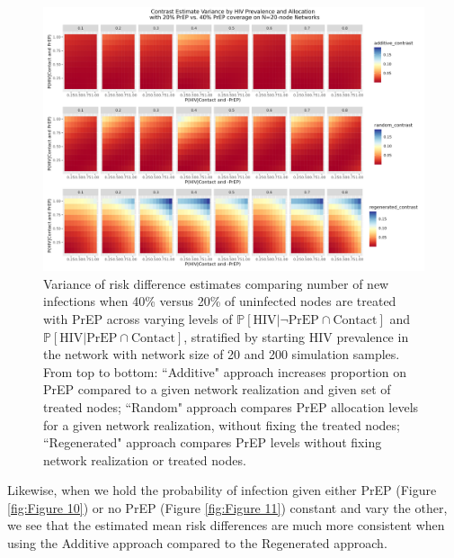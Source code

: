 \documentclass{article}
\theoremstyle{definition}
\begin{document}
\begin{figure}[H]
    \centering
    \includegraphics[width=\linewidth]{Corrected Figures/HIV Prevalence Variance Plot.png}
    \caption{Variance of risk difference estimates comparing number of new infections when 40\% versus 20\% of uninfected nodes are treated with PrEP across varying levels of $\mathbb{P}\left[\text{HIV} \vert \neg \text{PrEP} \cap \text{Contact}\right]$ and $\mathbb{P}\left[\text{HIV} \vert \text{PrEP} \cap \text{Contact}\right]$, stratified by starting HIV prevalence in the network with network size of 20 and 200 simulation samples.
    From top to bottom: ``Additive" approach increases proportion on PrEP compared to a given network realization and given set of treated nodes; ``Random" approach compares PrEP allocation levels for a given network realization, without fixing the treated nodes; ``Regenerated" approach compares PrEP levels without fixing network realization or treated nodes.}
    \label{fig:Figure 9}
\end{figure}


Likewise, when we hold the probability of infection given either PrEP (Figure \ref{fig:Figure 10}) or no PrEP (Figure \ref{fig:Figure 11}) constant and vary the other, we see that the estimated mean risk differences are much more consistent when using the Additive approach compared to the Regenerated approach. 
\end{document}

